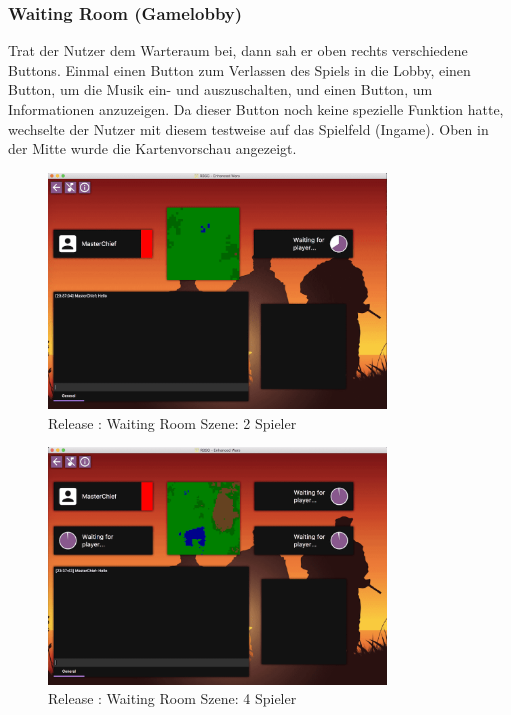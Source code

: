 \documentclass[12pt, titlepage]{scrartcl}
\newcommand{\RN}[1]{%
	\textup{\uppercase\expandafter{\romannumeral#1}}%
}
\begin{document}
	        \subsubsection{Waiting Room (Gamelobby)} \label{WAITING_ROOM}
                Trat der Nutzer dem Warteraum bei, dann sah er oben rechts verschiedene Buttons. Einmal einen Button zum Verlassen des Spiels in die Lobby, einen Button, um die Musik ein- und auszuschalten, und einen Button, um Informationen anzuzeigen. Da dieser Button noch keine spezielle Funktion hatte, wechselte der Nutzer mit diesem testweise auf das Spielfeld (Ingame). Oben in der Mitte wurde die Kartenvorschau angezeigt. \\
                \begin{figure}[H] 
    				\centering
    				\includegraphics[width=0.8\textwidth]{images/old_state/waiting_room/2Player.png}
    				\caption{Release \RN{2}: Waiting Room Szene: 2 Spieler}
    				\label{Waiting_Room_2}
			    \end{figure}
			    \begin{figure}[H] 
    				\centering
    				\includegraphics[width=0.8\textwidth]{images/old_state/waiting_room/4Player.png}
    				\caption{Release \RN{2}: Waiting Room Szene: 4 Spieler}
    				\label{Waiting_Room_4}
			    \end{figure}
\end{document}
